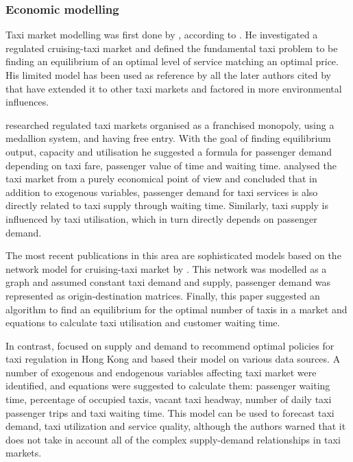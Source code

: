 \subsubsection{Economic modelling} 
\label{sec:literature:taxis:modelling}

Taxi market modelling was first done by \textcite{Douglas1972taxi+regulation},
according to \textcite{Salanova2011taxi+review}. He investigated a regulated
cruising-taxi market and defined the fundamental taxi problem to be finding an
equilibrium of an optimal level of service matching an optimal price. His
limited model has been used as reference by all the later authors cited by
\textcite{Salanova2011taxi+review} that have extended it to other taxi markets
and factored in more environmental influences.

\textcite{Devany1975taxi+capacity} researched regulated taxi markets organised
as a franchised monopoly, using a medallion system, and having free entry. With
the goal of finding equilibrium output, capacity and utilisation he suggested a
formula for passenger demand depending on taxi fare, passenger value of time
and waiting time. \textcite{Manski1967taxi+demand} analysed the taxi market
from a purely economical point of view and concluded that in addition to
exogenous variables, passenger demand for taxi services is also directly
related to taxi supply through waiting time. Similarly, taxi supply is
influenced by taxi utilisation, which in turn directly depends on passenger
demand.

The most recent publications in this area are sophisticated models based on the
network model for cruising-taxi market by \textcite{Yang1998taxi+network}. This
network was modelled as a graph and assumed constant taxi demand and supply,
passenger demand was represented as origin-destination matrices. Finally, this
paper suggested an algorithm to find an equilibrium for the optimal number of
taxis in a market and equations to calculate taxi utilisation and customer
waiting time.

In contrast, \textcite{Yang2000taxi+utilization} focused on supply and demand
to recommend optimal policies for taxi regulation in Hong Kong and based their
model on various data sources. A number of exogenous and endogenous variables
affecting taxi market were identified, and equations were suggested to
calculate them: passenger waiting time, percentage of occupied taxis, vacant
taxi headway, number of daily taxi passenger trips and taxi waiting time. This
model can be used to forecast taxi demand, taxi utilization and service
quality, although the authors warned that it does not take in account all of
the complex supply-demand relationships in taxi markets.

